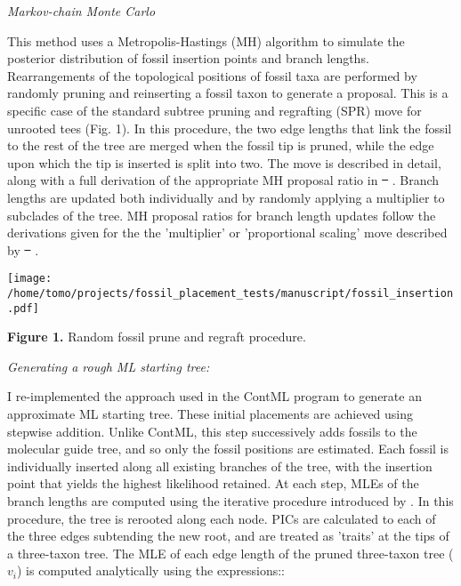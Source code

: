 \documentclass[12pt]{article}
\providecommand{\DIFadd}[1]{{\protect\color{blue}\uwave{#1}}} %
\providecommand{\DIFdel}[1]{{\protect\color{red}\sout{#1}}}                      %
\providecommand{\DIFaddbegin}{} %
\providecommand{\DIFaddend}{} %
\providecommand{\DIFdelbegin}{} %
\providecommand{\DIFdelend}{} %
\newcommand{\DIFscaledelfig}{0.5}
\newlength{\DIFdelgraphicswidth} %
\newlength{\DIFdelgraphicsheight} %
\newcommand{\DIFaddincludegraphics}[2][]{{\color{blue}\fbox{\DIFOincludegraphics[#1]{#2}}}} %
\newcommand{\DIFdelincludegraphics}[2][]{%
\sbox{\DIFdelgraphicsbox}{\DIFOincludegraphics[#1]{#2}}%
\settoboxwidth{\DIFdelgraphicswidth}{\DIFdelgraphicsbox} %
\settoboxtotalheight{\DIFdelgraphicsheight}{\DIFdelgraphicsbox} %
\scalebox{\DIFscaledelfig}{%
\parbox[b]{\DIFdelgraphicswidth}{\usebox{\DIFdelgraphicsbox}\\[-\baselineskip] \rule{\DIFdelgraphicswidth}{0em}}\llap{\resizebox{\DIFdelgraphicswidth}{\DIFdelgraphicsheight}{%
\setlength{\unitlength}{\DIFdelgraphicswidth}%
\begin{picture}(1,1)%
\thicklines\linethickness{2pt} %
{\color[rgb]{1,0,0}\put(0,0){\framebox(1,1){}}}%
{\color[rgb]{1,0,0}\put(0,0){\line( 1,1){1}}}%
{\color[rgb]{1,0,0}\put(0,1){\line(1,-1){1}}}%
\end{picture}%
}\hspace*{3pt}}} %
} %
\DeclareRobustCommand{\DIFaddbegin}{\DIFOaddbegin \let\includegraphics\DIFaddincludegraphics} %
\DeclareRobustCommand{\DIFaddend}{\DIFOaddend \let\includegraphics\DIFOincludegraphics} %
\DeclareRobustCommand{\DIFdelbegin}{\DIFOdelbegin \let\includegraphics\DIFdelincludegraphics} %
\DeclareRobustCommand{\DIFdelend}{\DIFOaddend \let\includegraphics\DIFOincludegraphics} %
\begin{document}
\noindent\emph{Markov-chain Monte Carlo}

 This method uses a
 Metropolis-Hastings (MH) algorithm \citep{hastings1970monte} to simulate the posterior distribution of fossil insertion points
and branch lengths. Rearrangements of the topological positions of fossil taxa are performed by randomly pruning
and reinserting a fossil taxon to generate a proposal. This is a
specific case of the standard subtree pruning and regrafting (SPR) move
for unrooted tees (Fig. 1). In this procedure, the two edge lengths that link the fossil to the rest of the tree are merged when the fossil tip is pruned,
while the edge upon which the tip is inserted is split into two. The move is described in detail, along with a full derivation of the appropriate
MH proposal ratio in \DIFdelbegin \DIFdel{\mbox{%
\cite[p. 287]{yang2014molecular}}\hspace{0pt}%
}\DIFdelend \DIFaddbegin \DIFadd{\mbox{%
\citet[p. 287]{yang2014molecular}}\hspace{0pt}%
}\DIFaddend .  Branch lengths are updated both individually and by randomly applying a
multiplier to subclades of the tree. MH proposal ratios for branch length updates follow the derivations given for the  the 'multiplier' or 'proportional scaling'
 move described by \DIFdelbegin \DIFdel{\mbox{%
\cite[p. 225]{yang2014molecular}}\hspace{0pt}%
}\DIFdelend \DIFaddbegin \DIFadd{\mbox{%
\citet[p. 225]{yang2014molecular}}\hspace{0pt}%
}\DIFaddend .

\texttt{[image: /home/tomo/projects/fossil\_placement\_tests/manuscript/fossil\_insertion.pdf]}

\textbf{Figure 1.} Random fossil prune and regraft procedure. 


\noindent\emph{Generating a rough ML starting tree:}

I re-implemented the approach used in the ContML program to generate an approximate ML starting tree. These initial placements are
achieved using stepwise addition. Unlike ContML, this step successively adds fossils to the molecular guide tree, and so only the fossil positions are estimated. 
Each fossil is individually inserted along all existing branches of the tree, with the insertion point that
yields the highest likelihood retained. At each step, MLEs of the branch
lengths are computed using the iterative procedure introduced by
\citep{felsenstein1981evolutionary}. In this procedure, the tree is rerooted along each
node. PICs are calculated to each of the three edges subtending the new
root, and are treated as 'traits' at the tips of a three-taxon tree. The MLE of each edge length of the pruned three-taxon tree  ($v_i$) is computed analytically
using the expressions::
\end{document}
